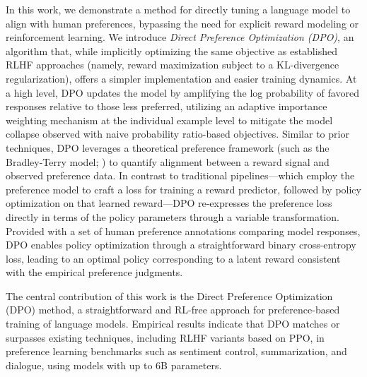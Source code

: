 In this work, we demonstrate a method for directly tuning a language model to align with human preferences, bypassing the need for explicit reward modeling or reinforcement learning. We introduce \textit{{Direct Preference Optimization} (DPO)}, an algorithm that, while implicitly optimizing the same objective as established RLHF approaches (namely, reward maximization subject to a KL-divergence regularization), offers a simpler implementation and easier training dynamics. At a high level, DPO updates the model by amplifying the log probability of favored responses relative to those less preferred, utilizing an adaptive importance weighting mechanism at the individual example level to mitigate the model collapse observed with naive probability ratio-based objectives. Similar to prior techniques, DPO leverages a theoretical preference framework (such as the Bradley-Terry model; \cite{bradley1952rankanalysis}) to quantify alignment between a reward signal and observed preference data. In contrast to traditional pipelines—which employ the preference model to craft a loss for training a reward predictor, followed by policy optimization on that learned reward—DPO re-expresses the preference loss directly in terms of the policy parameters through a variable transformation. Provided with a set of human preference annotations comparing model responses, DPO enables policy optimization through a straightforward binary cross-entropy loss, leading to an optimal policy corresponding to a latent reward consistent with the empirical preference judgments.

The central contribution of this work is the Direct Preference Optimization (DPO) method, a straightforward and RL-free approach for preference-based training of language models. Empirical results indicate that DPO matches or surpasses existing techniques, including RLHF variants based on PPO, in preference learning benchmarks such as sentiment control, summarization, and dialogue, using models with up to 6B parameters.

